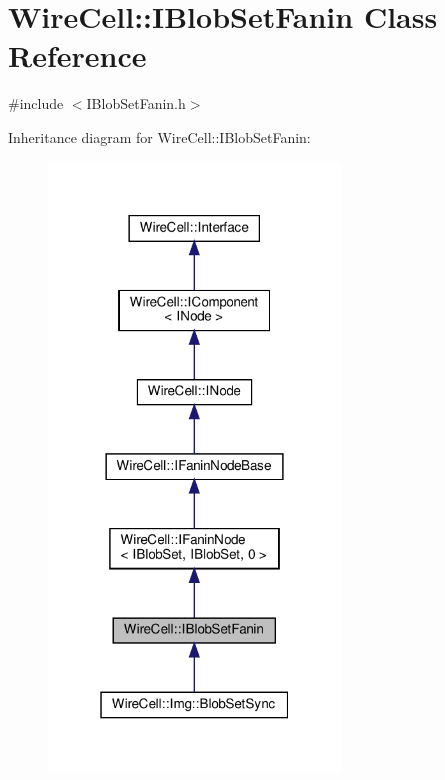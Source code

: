 \hypertarget{class_wire_cell_1_1_i_blob_set_fanin}{}\section{Wire\+Cell\+:\+:I\+Blob\+Set\+Fanin Class Reference}
\label{class_wire_cell_1_1_i_blob_set_fanin}


{\ttfamily \#include $<$I\+Blob\+Set\+Fanin.\+h$>$}



Inheritance diagram for Wire\+Cell\+:\+:I\+Blob\+Set\+Fanin\+:
\nopagebreak
\begin{figure}[H]
\begin{center}
\leavevmode
\includegraphics[width=220pt]{class_wire_cell_1_1_i_blob_set_fanin__inherit__graph}
\end{center}
\end{figure}


